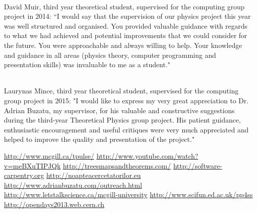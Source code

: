 \documentclass[12pt]{article} %
\begin{document}
\begin{appendices}
\ \\David Muir, third year theoretical student, supervised for the computing group project in 2014: ``I would say that the supervision of our physics project this year was well structured and organised. You provided valuable guidance with regards to what we had achieved and potential improvements that we could consider for the future. You were approachable and always willing to help. Your knowledge and guidance in all areas (physics theory, computer programming and presentation skills) was invaluable to me as a student."

\ \\Laurynas Mince, third year theoretical student, supervised for the computing group project in 2015: "I would like to express my very great appreciation to Dr. Adrian Buzatu, my supervisor, for his valuable and constructive suggestions during the third-year Theoretical Physics group project. His patient guidance, enthusiastic encouragement and useful critiques were very much appreciated and helped to improve the quality and presentation of the project."





\end{appendices}


\begin{thebibliography}{99} %

\url{http://www.mcgill.ca/tpulse/}
\url{http://www.youtube.com/watch?v=meBXuTIPJQk}
\url{http://treesmapsandtheorems.com/}
\url{http://software-carpentry.org}
\url{http://noapteacercetatorilor.eu}
\url{http://www.adrianbuzatu.com/outreach.html}
\url{http://www.letstalkscience.ca/mcgill-university}
\url{http://www.scifun.ed.ac.uk/pp4ss}
\url{http://opendays2013.web.cern.ch}
 
\end{thebibliography}
\end{document}
